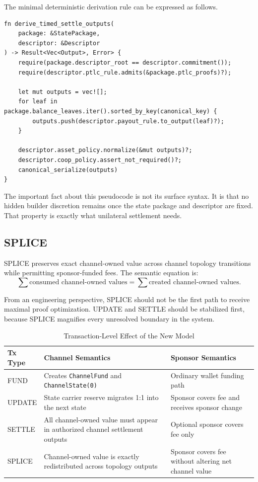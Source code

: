 \documentclass[11pt,a4paper]{article}
\newcommand{\code}[1]{\texttt{#1}}
\begin{document}
The minimal deterministic derivation rule can be expressed as follows.

\begin{lstlisting}[caption={Timed-Settle Output Derivation Sketch}, float=!htb]
fn derive_timed_settle_outputs(
    package: &StatePackage,
    descriptor: &Descriptor
) -> Result<Vec<Output>, Error> {
    require(package.descriptor_root == descriptor.commitment());
    require(descriptor.ptlc_rule.admits(&package.ptlc_proofs)?);

    let mut outputs = vec![];
    for leaf in package.balance_leaves.iter().sorted_by_key(canonical_key) {
        outputs.push(descriptor.payout_rule.to_output(leaf)?);
    }

    descriptor.asset_policy.normalize(&mut outputs)?;
    descriptor.coop_policy.assert_not_required()?;
    canonical_serialize(outputs)
}
\end{lstlisting}

The important fact about this pseudocode is not its surface syntax. It is that no hidden builder discretion remains once the state package and descriptor are fixed. That property is exactly what unilateral settlement needs.

\subsection{SPLICE}

SPLICE preserves exact channel-owned value across channel topology transitions while permitting sponsor-funded fees. The semantic equation is:
\[
\sum \text{consumed channel-owned values} = \sum \text{created channel-owned values}.
\]

From an engineering perspective, SPLICE should not be the first path to receive maximal proof optimization. UPDATE and SETTLE should be stabilized first, because SPLICE magnifies every unresolved boundary in the system.

\begin{table}[htbp]
\centering
\caption{Transaction-Level Effect of the New Model}
\label{tab:tx_semantics}
\small
\begin{tabularx}{\linewidth}{@{}l X X@{}}
\toprule
\textbf{Tx Type} & \textbf{Channel Semantics} & \textbf{Sponsor Semantics} \\
\midrule
FUND & Creates \code{ChannelFund} and \code{ChannelState(0)} & Ordinary wallet funding path \\
UPDATE & State carrier reserve migrates 1:1 into the next state & Sponsor covers fee and receives sponsor change \\
SETTLE & All channel-owned value must appear in authorized channel settlement outputs & Optional sponsor covers fee only \\
SPLICE & Channel-owned value is exactly redistributed across topology outputs & Sponsor covers fee without altering net channel value \\
\bottomrule
\end{tabularx}
\end{table}
\end{document}
